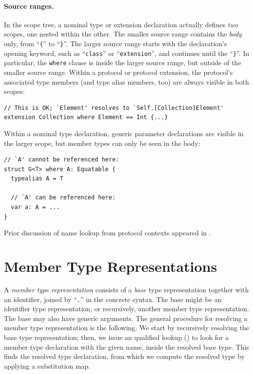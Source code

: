\documentclass[../generics]{subfiles}
\begin{document}
\paragraph{Source ranges.}
In the scope tree, a nominal type or extension declaration actually defines \emph{two} scopes, one nested within the other. The smaller source range contains the \emph{body} only, from ``\verb|{|'' to ``\verb|}|''. The larger source range starts with the declaration's opening keyword, such as ``\texttt{class}'' or ``\texttt{extension}'', and continues until the ``\verb|}|''. In particular, the \texttt{where} clause is inside the larger source range, but outside of the smaller source range. Within a protocol or protocol extension, the protocol's associated type members (and type alias members, too) are always visible in both scopes:
\begin{Verbatim}
// This is OK; `Element' resolves to `Self.[Collection]Element'
extension Collection where Element == Int {...}
\end{Verbatim}
Within a nominal type declaration, generic parameter declarations are visible in the larger scope, but member types can only be seen in the body:
\begin{Verbatim}
// `A' cannot be referenced here:
struct G<T> where A: Equatable {  
  typealias A = T

  // `A' can be referenced here:
  var a: A = ...
}
\end{Verbatim}
Prior discussion of name lookup from protocol contexts appeared in .

\section{Member Type Representations}\label{member type repr}

A \emph{member type representation} consists of a \emph{base} type representation together with an identifier, joined by ``\verb|.|'' in the concrete syntax. The base might be an identifier type representation, or recursively, another member type representation. The base may also have generic arguments. The general procedure for resolving a member type representation is the following. We start by recursively resolving the base type representation; then, we issue an qualified lookup () to look for a member type declaration with the given name, inside the resolved base type. This finds the resolved type declaration, from which we compute the resolved type by applying a substitution map.
\end{document}
